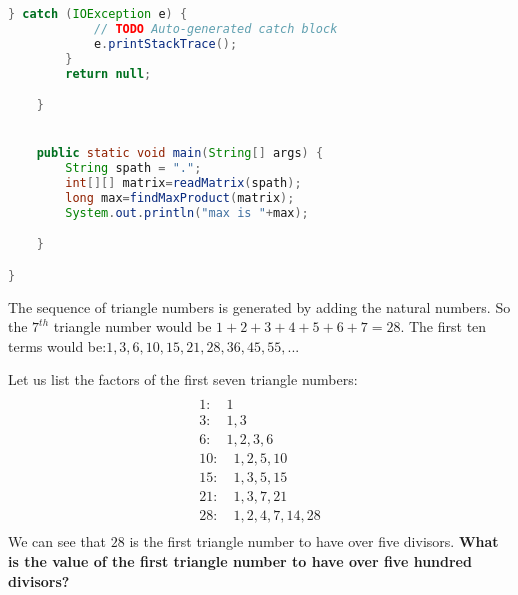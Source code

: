 \begin{solution}
\begin{lstlisting}[language=Java, caption="Java"]
		} catch (IOException e) {
			// TODO Auto-generated catch block
			e.printStackTrace();
		}
		return null;

	}


	public static void main(String[] args) {
		String spath = ".";
		int[][] matrix=readMatrix(spath);
		long max=findMaxProduct(matrix);
		System.out.println("max is "+max);

	}

}
		\end{lstlisting}  

\end{solution}	

\begin{problem}
The sequence of triangle numbers is generated by adding the natural numbers. So the $7^{th}$ triangle number would be $1 + 2 + 3 + 4 + 5 + 6 + 7 = 28$. The first ten terms would be:$1, 3, 6, 10, 15, 21, 28, 36, 45, 55, ...$

Let us list the factors of the first seven triangle numbers:
\begin{multline*}\\
 1:\quad 1 \\
 3:\quad 1,3\\
 6:\quad 1,2,3,6\\
10:\quad 1,2,5,10\\
15:\quad 1,3,5,15\\
21:\quad 1,3,7,21\\
28:\quad 1,2,4,7,14,28\\
\end{multline*}
We can see that $28$ is the first triangle number to have over five divisors.
\textbf{What is the value of the first triangle number to have over five hundred divisors?}
\end{problem}	

